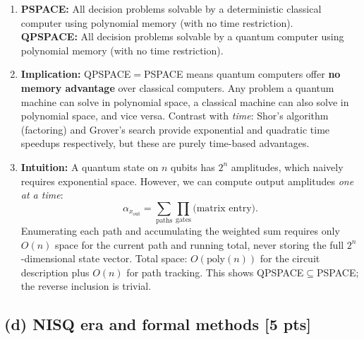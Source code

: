 \documentclass[11pt,a4paper]{article}
\begin{document}
\begin{enumerate}[label=(\roman*)]
  \item \textbf{PSPACE:} All decision problems solvable by a deterministic classical computer
    using polynomial memory (with no time restriction).\\
    \textbf{QPSPACE:} All decision problems solvable by a quantum computer
    using polynomial memory (with no time restriction).

  \item \textbf{Implication:} QPSPACE$=$PSPACE means quantum computers offer \textbf{no memory advantage}
    over classical computers. Any problem a quantum machine can solve in polynomial space,
    a classical machine can also solve in polynomial space, and vice versa.
    Contrast with \emph{time}: Shor's algorithm (factoring) and Grover's search provide exponential and
    quadratic time speedups respectively, but these are purely time-based advantages.

  \item \textbf{Intuition:} A quantum state on $n$ qubits has $2^n$ amplitudes, which naively requires
    exponential space. However, we can compute output amplitudes \emph{one at a time}:
    \[
    \alpha_{x_\text{out}}=\sum_{\text{paths}}\prod_{\text{gates}}\text{(matrix entry)}.
    \]
    Enumerating each path and accumulating the weighted sum requires only $O(n)$ space for
    the current path and running total, never storing the full $2^n$-dimensional state vector.
    Total space: $O(\text{poly}(n))$ for the circuit description plus $O(n)$ for path tracking.
    This shows QPSPACE$\subseteq$PSPACE; the reverse inclusion is trivial.
\end{enumerate}

\subsection*{(d) NISQ era and formal methods [5 pts]}
\end{document}
